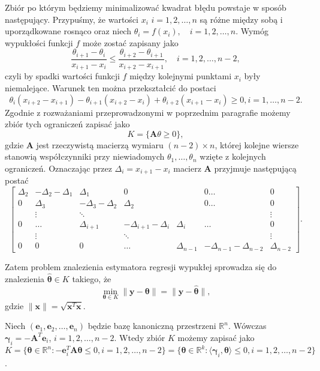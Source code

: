 \documentclass[12pt]{mwart}
\begin{document}
Zbiór po którym będziemy minimalizować kwadrat błędu powstaje w sposób następujący.
Przypuśmy, że wartości $x_i$ $i=1,2,\dots ,n$ są różne między sobą i uporządkowane rosnąco oraz niech $\theta_i = f(x_i), \quad i=1,2,\dots, n$. Wymóg wypukłości funkcji $f$ może zostać zapisany jako 
\begin{displaymath}
\frac{\theta_{i+1}-\theta_i}{x_{i+1}-x_i}\leq \frac{\theta_{i+2}-\theta_{i+1}}{x_{i+2}-x_{i+1}},\quad i=1,2,\dots,n-2,
\end{displaymath}
czyli by spadki wartości funkcji $f$ między kolejnymi punktami $x_i$ były niemalejące. Warunek ten można przekształcić do postaci
\begin{displaymath}
\theta_i (x_{i+2}-x_{i+1})-\theta_{i+1} (x_{i+2}-x_i)+\theta_{i+2}(x_{i+1}-x_i)\geq 0, i=1,\dots,n-2.
\end{displaymath}
Zgodnie z rozważaniami przeprowadzonymi w poprzednim paragrafie możemy zbiór tych ograniczeń zapisać jako
\begin{displaymath}
K=\{\mathbf{A}\theta \geq 0\},
\end{displaymath}
gdzie $\pmb{A}$ jest rzeczywistą macierzą wymiaru $(n-2)\times n$, której kolejne wiersze stanowią współczynniki przy niewiadomych $\theta_1,\dots,\theta_n$ wzięte z kolejnych ograniczeń. Oznaczając przez $\Delta_i=x_{i+1}-x_i$ macierz $\pmb{A}$ przyjmuje następującą postać
\begin{displaymath}
\left[\begin{array}{ccccccc}
\Delta_2&-\Delta_2-\Delta_1&\Delta_1&0&&0\dots&0\\
0&\Delta_3&-\Delta_3-\Delta_2&\Delta_2&&0\dots&0\\
&\vdots&\ddots&&&&\vdots\\
0&\dots&\Delta_{i+1}&-\Delta_{i+1}-\Delta_i&\Delta_i&\dots&0\\
&\vdots&&\ddots&&&\vdots\\
0&0&0&\dots&\Delta_{n-1}&-\Delta_{n-1}-\Delta_{n-2}&\Delta_{n-2}
\end{array}\right].
\end{displaymath}

Zatem problem znalezienia estymatora regresji wypukłej sprowadza się do znalezienia $\hat{\pmb{\theta}}\in K$ takiego, że
\begin{displaymath}
\min_{\pmb{\theta}\in K}\|\pmb{y}-\pmb{\theta}\|=\|\pmb{y}-\hat{\pmb{\theta}}\|,
\end{displaymath}
gdzie $\|\mathbf{x}\|=\sqrt{\mathbf{x}^T\mathbf{x}}$.

Niech $(\mathbf{e}_1,\mathbf{e}_2,\dots,\mathbf{e}_n)$ będzie bazę kanoniczną przestrzeni $\mathbb{R}^n$. Wówczas $\pmb{\gamma}_i=-\pmb{A}^T\pmb{e}_i$, $i=1,2,\dots,n-2$. Wtedy zbiór $K$ możemy zapisać jako $K=\{\pmb{\theta}\in \mathbb{R}^n\colon -\pmb{e}_i^T\pmb{A}\pmb{\theta}\leq 0,i=1,2,\dots,n-2\}=\{\pmb{\theta} \in \mathbb{R}^k\colon \langle \pmb{\gamma}_i, \pmb{\theta}\rangle\leq 0, i=1,2,\dots,n-2\}$.
\end{document}
